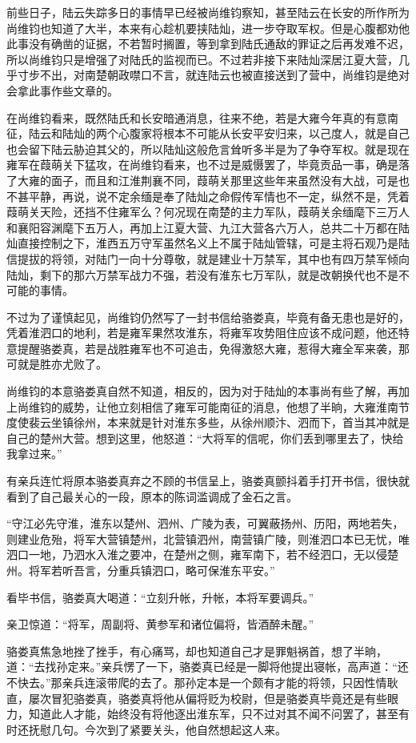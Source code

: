 前些日子，陆云失踪多日的事情早已经被尚维钧察知，甚至陆云在长安的所作所为尚维钧也知道了大半，本来有心趁机要挟陆灿，进一步夺取军权。但是心腹都劝他此事没有确凿的证据，不若暂时搁置，等到拿到陆氏通敌的罪证之后再发难不迟，所以尚维钧只是增强了对陆氏的监视而已。不过若非接下来陆灿深居江夏大营，几乎寸步不出，对南楚朝政噤口不言，就连陆云也被直接送到了营中，尚维钧是绝对会拿此事作些文章的。

在尚维钧看来，既然陆氏和长安暗通消息，往来不绝，若是大雍今年真的有意南征，陆云和陆灿的两个心腹家将根本不可能从长安平安归来，以己度人，就是自己也会留下陆云胁迫其父的，所以陆灿这般危言耸听多半是为了争夺军权。就是现在雍军在葭萌关下猛攻，在尚维钧看来，也不过是威慑罢了，毕竟贡品一事，确是落了大雍的面子，而且和江淮荆襄不同，葭萌关那里这些年来虽然没有大战，可是也不甚平静，再说，说不定余缅是奉了陆灿之命假传军情也不一定，纵然不是，凭着葭萌关天险，还挡不住雍军么？何况现在南楚的主力军队，葭萌关余缅麾下三万人和襄阳容渊麾下五万人，再加上江夏大营、九江大营各六万人，总共二十万都在陆灿直接控制之下，淮西五万守军虽然名义上不属于陆灿管辖，可是主将石观乃是陆信提拔的将领，对陆门一向十分尊敬，就是建业十万禁军，其中也有四万禁军倾向陆灿，剩下的那六万禁军战力不强，若没有淮东七万军队，就是改朝换代也不是不可能的事情。

不过为了谨慎起见，尚维钧仍然写了一封书信给骆娄真，毕竟有备无患也是好的，凭着淮泗口的地利，若是雍军果然攻淮东，将雍军攻势阻住应该不成问题，他还特意提醒骆娄真，若是战胜雍军也不可追击，免得激怒大雍，惹得大雍全军来袭，那可就是胜亦尤败了。

尚维钧的本意骆娄真自然不知道，相反的，因为对于陆灿的本事尚有些了解，再加上尚维钧的威势，让他立刻相信了雍军可能南征的消息，他想了半晌，大雍淮南节度使裴云坐镇徐州，本来就是针对淮东多些，从徐州顺汴、泗而下，首当其冲就是自己的楚州大营。想到这里，他怒道：“大将军的信呢，你们丢到哪里去了，快给我拿过来。”

有亲兵连忙将原本骆娄真弃之不顾的书信呈上，骆娄真颤抖着手打开书信，很快就看到了自己最关心的一段，原本的陈词滥调成了金石之言。

“守江必先守淮，淮东以楚州、泗州、广陵为表，可翼蔽扬州、历阳，两地若失，则建业危殆，将军大营镇楚州，北营镇泗州，南营镇广陵，则淮泗口本已无忧，唯泗口一地，乃泗水入淮之要冲，在楚州之侧，雍军南下，若不经泗口，无以侵楚州。将军若听吾言，分重兵镇泗口，略可保淮东平安。”

看毕书信，骆娄真大喝道：“立刻升帐，升帐，本将军要调兵。”

亲卫惊道：“将军，周副将、黄参军和诸位偏将，皆酒醉未醒。”

骆娄真焦急地挫了挫手，有心痛骂，却也知道自己才是罪魁祸首，想了半晌，道：“去找孙定来。”亲兵愣了一下，骆娄真已经是一脚将他提出寝帐，高声道：“还不快去。”那亲兵连滚带爬的去了。那孙定本是一个颇有才能的将领，只因性情耿直，屡次冒犯骆娄真，骆娄真将他从偏将贬为校尉，但是骆娄真毕竟还是有些眼力，知道此人才能，始终没有将他逐出淮东军，只不过对其不闻不问罢了，甚至有时还抚慰几句。今次到了紧要关头，他自然想起这人来。

